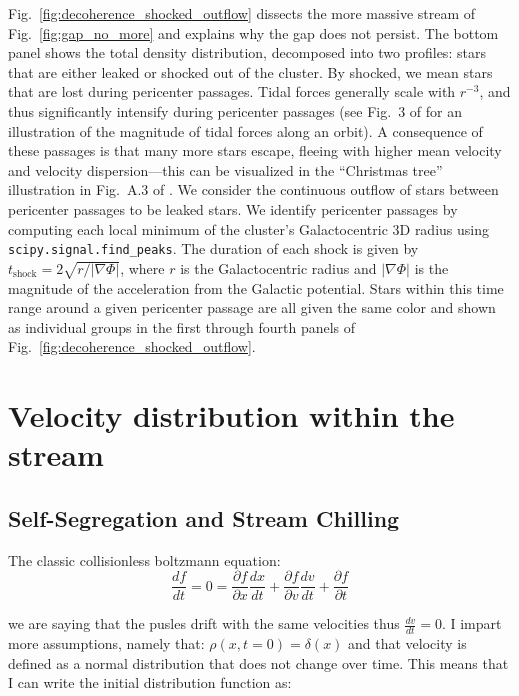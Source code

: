         Fig.~\ref{fig:decoherence_shocked_outflow} dissects the more massive stream of Fig.~\ref{fig:gap_no_more} and explains why the gap does not persist. The bottom panel shows the total density distribution, decomposed into two profiles: stars that are either leaked or shocked out of the cluster. By shocked, we mean stars that are lost during pericenter passages. Tidal forces generally scale with $r^{-3}$, and thus significantly intensify during pericenter passages (see Fig.~3 of \citet{2004AJ....127.2753D} for an illustration of the magnitude of tidal forces along an orbit). A consequence of these passages is that many more stars escape, fleeing with higher mean velocity and velocity dispersion—this can be visualized in the ``Christmas tree'' illustration in Fig.~A.3 of \citet{2012A&A...546L...7M}. We consider the continuous outflow of stars between pericenter passages to be leaked stars. We identify pericenter passages by computing each local minimum of the cluster's Galactocentric 3D radius using \texttt{scipy.signal.find\_peaks}. The duration of each shock is given by $t_{\textrm{shock}} = 2\sqrt{r/|\nabla\Phi|}$, where $r$ is the Galactocentric radius and $|\nabla\Phi|$ is the magnitude of the acceleration from the Galactic potential. Stars within this time range around a given pericenter passage are all given the same color and shown as individual groups in the first through fourth panels of Fig.~\ref{fig:decoherence_shocked_outflow}.



\section{Velocity distribution within the stream}

    \subsection{Self-Segregation and Stream Chilling}

    The classic collisionless boltzmann equation:
    \begin{equation}
        \frac{df}{dt} = 0 = \frac{\partial f}{\partial x} \frac{dx}{dt} + \frac{\partial f}{\partial v} \frac{dv}{dt}+ \frac{\partial f}{\partial t} 
    \end{equation}

    we are saying that the pusles drift with the same velocities thus $\frac{dv}{dt}=0$. I impart more assumptions, namely that: $\rho(x,t=0)=\delta(x)$ and that velocity is defined as a normal distribution that does not change over time. This means that I can write the initial distribution function as:
    
